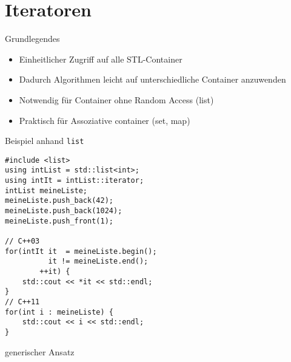 \section{Iteratoren}

\begin{frame}[fragile]{Grundlegendes}
	\begin{itemize}
		\item Einheitlicher Zugriff auf alle STL-Container
		\item Dadurch Algorithmen leicht auf unterschiedliche Container anzuwenden
		\item Notwendig für Container ohne Random Access (list)
		\item Praktisch für Assoziative container (set, map)
	\end{itemize}
\end{frame}

\begin{frame}[fragile]{Beispiel anhand \texttt{list}}
	\begin{lstlisting}[]
#include <list>
using intList = std::list<int>;
using intIt = intList::iterator;
intList meineListe;
meineListe.push_back(42);
meineListe.push_back(1024);
meineListe.push_front(1);

// C++03
for(intIt it  = meineListe.begin();
          it != meineListe.end();
        ++it) {
    std::cout << *it << std::endl;
}
// C++11
for(int i : meineListe) {
    std::cout << i << std::endl;
}
	\end{lstlisting}
\end{frame}

\begin{frame}[t]{generischer Ansatz}
	\onslide*<+> {  }
	\onslide<+-> {  }
\end{frame}
